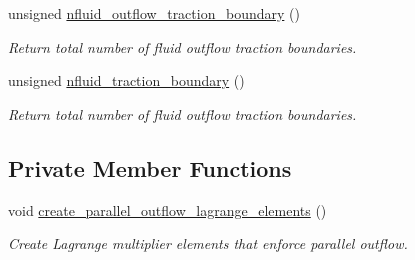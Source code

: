 \begin{DoxyCompactItemize}
unsigned \hyperlink{classUnstructuredFluidProblem_abcaa700f2e0e1b2097e7dc25fe087862}{nfluid\+\_\+outflow\+\_\+traction\+\_\+boundary} ()
\begin{DoxyCompactList}\small\item\em Return total number of fluid outflow traction boundaries. \end{DoxyCompactList}\item 
unsigned \hyperlink{classUnstructuredFluidProblem_ae04e768e915a5e097527cea22558203d}{nfluid\+\_\+traction\+\_\+boundary} ()
\begin{DoxyCompactList}\small\item\em Return total number of fluid outflow traction boundaries. \end{DoxyCompactList}\end{DoxyCompactItemize}
\subsection*{Private Member Functions}
\begin{DoxyCompactItemize}
\item 
void \hyperlink{classUnstructuredFluidProblem_aea2fa32b4dd90aab81da540566b9925a}{create\+\_\+parallel\+\_\+outflow\+\_\+lagrange\+\_\+elements} ()
\begin{DoxyCompactList}\small\item\em Create Lagrange multiplier elements that enforce parallel outflow. \end{DoxyCompactList}\end{DoxyCompactItemize}
